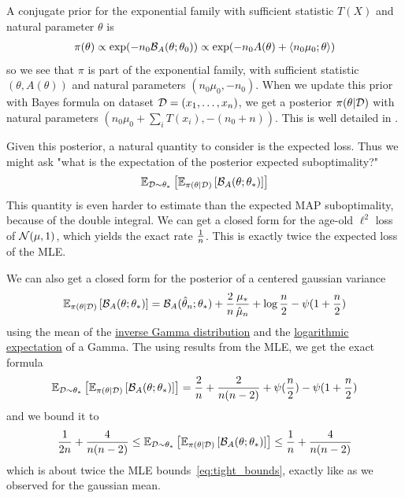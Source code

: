 \documentclass{article}
\newenvironment{example}{
	\begin{mdframed}[backgroundcolor=light-gray, roundcorner=5pt]
}{		
	\end{mdframed}
}
\newcommand*{\expect}[2][]{\ensuremath{\mathbb{E}_{#1} \left[ #2 \right] }} %
\newcommand{\logpart}{A}
\newcommand{\bregman}{\cB_\logpart}
\newcommand{\natp}{\theta}
\begin{document}
A conjugate prior for the exponential family with sufficient statistic $T(X)$ and natural parameter $\natp$ is 
\begin{align}
    \pi(\natp) 
    \propto \exp(-n_0 \bregman(\natp ; \natp_0)) 
    \propto \exp(-n_0 \logpart(\natp) + \langle n_0 \mu_0 ; \natp \rangle)
\end{align}
so we see that $\pi$ is part of the exponential family, with sufficient statistic $(\natp, \logpart(\natp))$ and natural parameters $(n_0 \mu_0 , -n_0)$. When we update this prior with Bayes formula on dataset ${\mathcal D}=(x_1,\dots,x_n)$, we get a posterior $\pi(\natp | \cD)$ with natural parameters $(n_0 \mu_0 + \sum_i T(x_i) , -(n_0 + n))$. This is well detailed in \citet{agarwal2010geometric}. 

Given this posterior, a natural quantity to consider is the expected loss. Thus we might ask "what is the expectation of the posterior expected suboptimality?"
\begin{align}
    \expect[\cD\sim\natp_*]{\expect[\pi(\natp|\cD)]{\bregman(\natp ; \natp_*)}}
\end{align}
This quantity is even harder to estimate than the expected MAP suboptimality, because of the double integral. We can get a closed form for the age-old $\ell^2$ loss of ${\mathcal N}(\mu, 1)$, which yields the exact rate $\frac{1}{n}$. This is exactly twice the expected loss of the MLE.

\begin{example}
	We can also get a closed form for the posterior of a centered gaussian variance 
	\begin{align}
		\expect[\pi(\natp|\cD)]{\bregman(\natp ; \natp_*)} = \bregman(\hat \natp_n ; \natp_*) + \frac{2}{n} \frac{\mu_*}{\hat \mu_n} + \log\frac{n}{2} - \psi(1 + \frac{n}{2})
	\end{align}
	using the mean of the \href{https://en.wikipedia.org/wiki/Inverse-gamma_distribution}{inverse Gamma distribution} and the \href{https://en.wikipedia.org/wiki/Gamma_distribution#Logarithmic_expectation_and_variance}{logarithmic expectation} of a Gamma. The using results from the MLE, we get the exact formula
	\begin{align}
		\expect[\cD\sim\natp_*]{\expect[\pi(\natp|\cD)]{\bregman(\natp ; \natp_*)}}
		= \frac{2}{n} + \frac{2}{n(n-2)} + \psi(\half[n]) - \psi(1+ \half[n])
	\end{align}
	and we bound it to 
	\begin{align}
		\inv{2n} + \frac{4}{n(n-2)}
		\leq \expect[\cD\sim\natp_*]{\expect[\pi(\natp|\cD)]{\bregman(\natp ; \natp_*)}}
		\leq 
		\inv{n} + \frac{4}{n(n-2)}
	\end{align}
	which is about twice the MLE bounds~\eqref{eq:tight_bounds}, exactly like as we observed for the gaussian mean.
\end{example}
\end{document}
